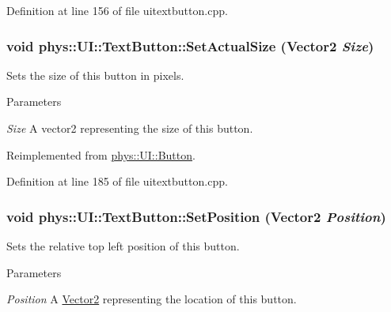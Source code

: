 Definition at line 156 of file uitextbutton.cpp.

\hypertarget{classphys_1_1UI_1_1TextButton_ad83c81eda54a861b9e34b565027b8254}{
\subsubsection[{SetActualSize}]{\setlength{\rightskip}{0pt plus 5cm}void phys::UI::TextButton::SetActualSize ({\bf Vector2} {\em Size})}}
\label{df/d03/classphys_1_1UI_1_1TextButton_ad83c81eda54a861b9e34b565027b8254}


Sets the size of this button in pixels. 


\begin{DoxyParams}{Parameters}
\item[{\em Size}]A vector2 representing the size of this button. \end{DoxyParams}


Reimplemented from \hyperlink{classphys_1_1UI_1_1Button_a4075f879a67726b80c18d3bc647e12fe}{phys::UI::Button}.



Definition at line 185 of file uitextbutton.cpp.

\hypertarget{classphys_1_1UI_1_1TextButton_a57f8955e357e9e55e339237a91d8c209}{
\subsubsection[{SetPosition}]{\setlength{\rightskip}{0pt plus 5cm}void phys::UI::TextButton::SetPosition ({\bf Vector2} {\em Position})}}
\label{df/d03/classphys_1_1UI_1_1TextButton_a57f8955e357e9e55e339237a91d8c209}


Sets the relative top left position of this button. 


\begin{DoxyParams}{Parameters}
\item[{\em Position}]A \hyperlink{classphys_1_1Vector2}{Vector2} representing the location of this button. \end{DoxyParams}


